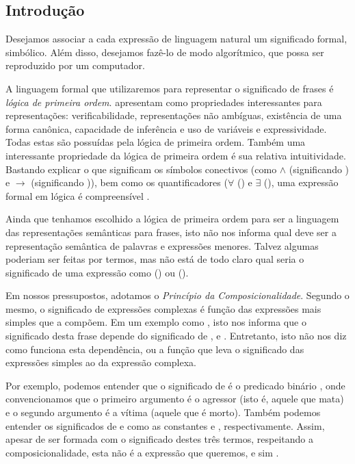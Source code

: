 
\subsection{Introdução}

Desejamos associar a cada expressão de linguagem natural um significado formal, simbólico. Além disso, desejamos fazê-lo de modo algorítmico, que possa ser reproduzido por um computador.

A linguagem formal que utilizaremos para representar o significado de frases é \textit{lógica de primeira ordem}. \citet{Jurafsky:2009} apresentam como propriedades interessantes para representações: verificabilidade, representações não ambíguas, existência de uma forma canônica, capacidade de inferência e uso de variáveis e expressividade. Todas estas são possuídas pela lógica de primeira ordem. %
Também uma interessante propriedade da lógica de primeira ordem é sua relativa intuitividade. Bastando explicar o que significam os símbolos conectivos (como $\land$ (significando ) e $\rightarrow$ (significando )), bem como os quantificadores ($\forall$ ()  e $\exists$ (), uma expressão formal em lógica é compreensível . 

Ainda que tenhamos escolhido a lógica de primeira ordem para ser a linguagem das representações semânticas para frases, isto não nos informa qual deve ser a representação semântica de palavras e expressões menores. Talvez algumas poderiam ser feitas por termos, mas não está de todo claro qual seria o significado de uma expressão como  () ou  ().

Em nossos pressupostos, adotamos o \textit{Princípio da Composicionalidade}. Segundo o mesmo, o significado de expressões complexas é função das expressões mais simples que a compõem. Em um exemplo como , isto nos informa que o significado desta frase depende do significado de ,  e . Entretanto, isto não nos diz como funciona esta dependência, ou a função que leva o significado das expressões simples ao da expressão complexa.

Por exemplo, podemos entender que o significado de  é o predicado binário , onde convencionamos que o primeiro argumento é o agressor (isto é, aquele que mata) e o segundo argumento é a vítima (aquele que é morto). Também podemos entender os significados de  e  como as constantes  e , respectivamente. Assim, apesar de  ser formada com o significado destes três termos, respeitando a composicionalidade, esta não é a expressão que queremos, e sim .

